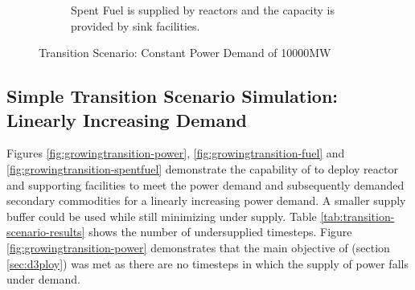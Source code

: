 \begin{figure}[]
\begin{subfigure}[t]{0.6\textwidth}
            \caption{Spent Fuel is supplied by reactors and the capacity is provided by sink facilities.}
            \label{fig:constanttransition-spentfuel}
        \end{subfigure}
        \caption{Transition Scenario: Constant Power Demand of 10000MW}
    \end{figure}

    \subsection{Simple Transition Scenario Simulation: Linearly Increasing Demand}

    Figures \ref{fig:growingtransition-power}, \ref{fig:growingtransition-fuel}
    and \ref{fig:growingtransition-spentfuel} demonstrate the capability 
    of \deploy to deploy reactor and supporting facilities to meet the
    power demand and subsequently demanded secondary commodities 
    for a linearly increasing power demand. 
    A smaller supply buffer could be used while still minimizing under supply.
    Table \ref{tab:transition-scenario-results} shows the number of 
    undersupplied timesteps. 
    Figure \ref{fig:growingtransition-power} demonstrates that
    the main objective of \deploy (section \ref{sec:d3ploy}) 
    was met as there are no timesteps
    in which the supply of power falls under demand.
    
